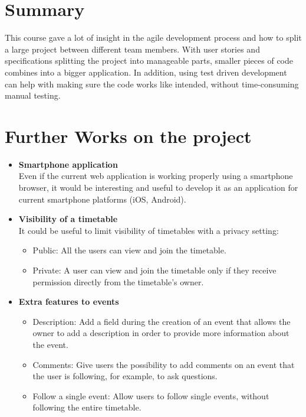
\section{Summary}
\vspace{-5mm}
This course gave a lot of insight in the agile development process and how to split a large project between different team members. With user stories and specifications splitting the project into manageable parts, smaller pieces of code combines into a bigger application. In addition, using test driven development can help with making sure the code works like intended, without time-consuming manual testing.

\section{Further Works on the project}
\vspace{-5mm}
\begin{itemize}
\item \textbf{Smartphone application}\\ Even if the current web application is working properly using a smartphone browser, it would be interesting and useful to develop it as an application for current smartphone platforms (iOS, Android).
\item \textbf{Visibility of a timetable}\\
It could be useful to limit visibility of timetables with a privacy setting:
\vspace{-3mm}
\begin{itemize}
	\item Public: All the users can view and join the timetable.
	\item Private: A user can view and join the timetable only if they receive permission directly from the timetable's owner.
\end{itemize}
\item \textbf{Extra features to events}
\vspace{-3mm}
\begin{itemize}
	\item Description: Add a field during the creation of an event that allows the owner to add a description in order to provide more information about the event.
	\item Comments: Give users the possibility to add comments on an event that the user is following, for example, to ask questions.
	\item Follow a single event: Allow users to follow single events, without following the entire timetable.
\end{itemize}
\end{itemize}

